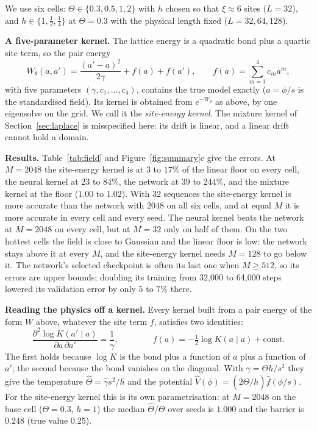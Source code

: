 \documentclass[11pt,a4paper]{article}
\begin{document}
We use six cells: $\Theta\in\{0.3,0.5,1,2\}$ with $h$ chosen so that $\xi\approx6$ sites ($L=32$), and $h\in\{1,\tfrac12,\tfrac14\}$
at $\Theta=0.3$ with the physical length fixed ($L=32,64,128$).

\textbf{A five-parameter kernel.} The lattice energy is a quadratic bond plus a quartic site term, so the pair energy
\[
W_\theta(a,a')=\frac{(a'-a)^2}{2\gamma}+f(a)+f(a'),\qquad f(a)=\sum_{m=1}^{4}c_m a^m,
\]
with five parameters $(\gamma,c_1,\dots,c_4)$, contains the true model exactly ($a=\phi/s$ is the standardised field). Its kernel
is obtained from $e^{-W_\theta}$ as above, by one eigensolve on the grid. We call it the \emph{site-energy kernel}. The mixture
kernel of Section~\ref{sec:laplace} is misspecified here: its drift is linear, and a linear drift cannot hold a domain.

\textbf{Results.} Table~\ref{tab:field} and Figure~\ref{fig:summary}c give the errors. At $M=2048$ the site-energy kernel is at
$3$ to $17\%$ of the linear floor on every cell, the neural kernel at $23$ to $84\%$, the network at $39$ to $244\%$, and the
mixture kernel at the floor ($1.00$ to $1.02$). With $32$ sequences the site-energy kernel is more accurate than the network
with $2048$ on all six cells, and at equal $M$ it is more accurate in every cell and every seed. The neural kernel beats the
network at $M=2048$ on every cell, but at $M=32$ only on half of them. On the two hottest cells the field is close to Gaussian
and the linear floor is low: the network stays above it at every $M$, and the site-energy kernel needs $M=128$ to go below it.
The network's selected checkpoint is often its last one when $M\ge512$, so its errors are upper bounds; doubling its training
from 32{,}000 to 64{,}000 steps lowered its validation error by only $5$ to $7\%$ there.



\textbf{Reading the physics off a kernel.} Every kernel built from a pair energy of the form $W$ above, whatever the site term
$f$, satisfies two identities:
\[
\frac{\partial^2\log K(a'\mid a)}{\partial a\,\partial a'}=\frac{1}{\gamma},\qquad\qquad f(a)=-\tfrac12\log K(a\mid a)+\text{const}.
\]
The first holds because $\log K$ is the bond plus a function of $a$ plus a function of $a'$; the second because the bond
vanishes on the diagonal. With $\gamma=\Theta h/s^2$ they give the temperature $\hat\Theta=\hat\gamma s^2/h$ and the potential
$\hat V(\phi)=(2\hat\Theta/h)\hat f(\phi/s)$. For the site-energy kernel this is its own parametrisation: at $M=2048$ on the base
cell ($\Theta=0.3$, $h=1$) the median $\hat\Theta/\Theta$ over seeds is $1.000$ and the barrier is $0.248$ (true value $0.25$).
\end{document}
